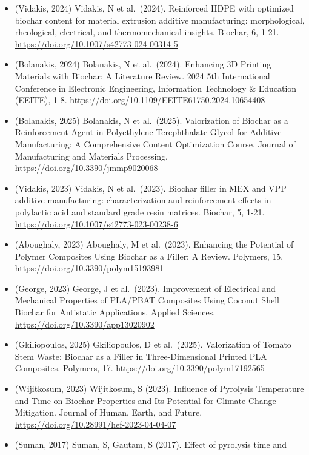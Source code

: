 \documentclass[
]{article}
\providecommand{\tightlist}{%
  \setlength{\itemsep}{0pt}\setlength{\parskip}{0pt}}
\begin{document}
\begin{itemize}
\tightlist
\item
  (Vidakis, 2024) Vidakis, N et al.~(2024). Reinforced HDPE with
  optimized biochar content for material extrusion additive
  manufacturing: morphological, rheological, electrical, and
  thermomechanical insights. Biochar, 6, 1-21.
  \url{https://doi.org/10.1007/s42773-024-00314-5}
\item
  (Bolanakis, 2024) Bolanakis, N et al.~(2024). Enhancing 3D Printing
  Materials with Biochar: A Literature Review. 2024 5th International
  Conference in Electronic Engineering, Information Technology \&
  Education (EEITE), 1-8.
  \url{https://doi.org/10.1109/EEITE61750.2024.10654408}
\item
  (Bolanakis, 2025) Bolanakis, N et al.~(2025). Valorization of Biochar
  as a Reinforcement Agent in Polyethylene Terephthalate Glycol for
  Additive Manufacturing: A Comprehensive Content Optimization Course.
  Journal of Manufacturing and Materials Processing.
  \url{https://doi.org/10.3390/jmmp9020068}
\item
  (Vidakis, 2023) Vidakis, N et al.~(2023). Biochar filler in MEX and
  VPP additive manufacturing: characterization and reinforcement effects
  in polylactic acid and standard grade resin matrices. Biochar, 5,
  1-21. \url{https://doi.org/10.1007/s42773-023-00238-6}
\item
  (Aboughaly, 2023) Aboughaly, M et al.~(2023). Enhancing the Potential
  of Polymer Composites Using Biochar as a Filler: A Review. Polymers,
  15. \url{https://doi.org/10.3390/polym15193981}
\item
  (George, 2023) George, J et al.~(2023). Improvement of Electrical and
  Mechanical Properties of PLA/PBAT Composites Using Coconut Shell
  Biochar for Antistatic Applications. Applied Sciences.
  \url{https://doi.org/10.3390/app13020902}
\item
  (Gkiliopoulos, 2025) Gkiliopoulos, D et al.~(2025). Valorization of
  Tomato Stem Waste: Biochar as a Filler in Three-Dimensional Printed
  PLA Composites. Polymers, 17.
  \url{https://doi.org/10.3390/polym17192565}
\item
  (Wijitkosum, 2023) Wijitkosum, S (2023). Influence of Pyrolysis
  Temperature and Time on Biochar Properties and Its Potential for
  Climate Change Mitigation. Journal of Human, Earth, and Future.
  \url{https://doi.org/10.28991/hef-2023-04-04-07}
\item
  (Suman, 2017) Suman, S, Gautam, S (2017). Effect of pyrolysis time and

\end{itemize}
\end{document}
